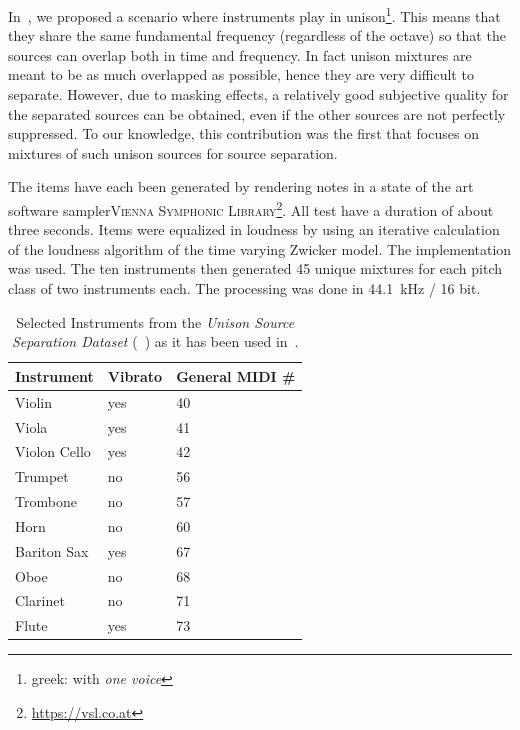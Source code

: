 
In~\cite{stoeter14}, we proposed a scenario where instruments play in unison\footnote{greek: with \emph{one voice}}. 
This means that they share the same fundamental frequency (regardless of the octave) so that the sources can overlap both in time and frequency. In fact unison mixtures are meant to be as much overlapped as possible, hence they are very difficult to separate. However, due to masking effects, a relatively good subjective quality for the separated sources can be obtained, even if the other sources are not perfectly suppressed.
To our knowledge, this contribution was the first that focuses on mixtures of such unison sources for source separation.
\par
The items have each been generated by rendering notes in a state of the art software sampler\textsc{Vienna Symphonic Library}\footnote{\url{https://vsl.co.at}}. All test have a duration of about three seconds. Items were equalized in loudness by using an iterative calculation of the loudness algorithm of the time varying Zwicker model. The implementation \cite{genesis12} was used. The ten instruments then generated 45 unique mixtures for each pitch class of two instruments each. The processing was done in 44.1~kHz / 16 bit.

\begin{table}
\begin{center}
\footnotesize
\begin{tabular}{ l l l}
  Instrument & Vibrato &  General MIDI \# \\
  \hline
  Violin & yes & 40 \\
  Viola & yes & 41 \\
  Violon Cello & yes & 42 \\
  Trumpet & no & 56 \\
  Trombone & no & 57\\
  Horn & no & 60  \\
  Bariton Sax & yes & 67 \\ %
  Oboe & no & 68\\
  Clarinet & no & 71\\
  Flute & yes & 73\\
\end{tabular}
\end{center}
\caption{Selected Instruments from the \emph{Unison Source Separation Dataset} (~\cite{oss_unison}) as it has been used in~\cite{stoeter14, stoeter16}.}
\label{tab:testset}
\end{table}

